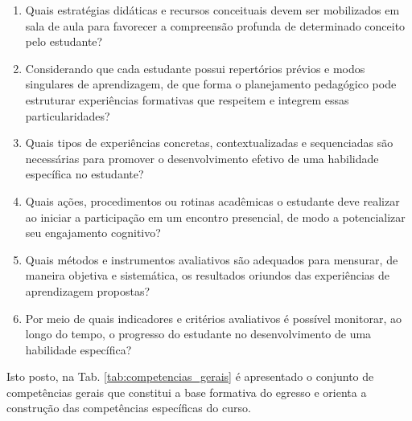 \begin{enumerate}
		\item Quais estratégias didáticas e recursos conceituais devem ser mobilizados em sala de aula para favorecer a compreensão profunda de determinado conceito pelo estudante?
		
		\item Considerando que cada estudante possui repertórios prévios e modos singulares de aprendizagem, de que forma o planejamento pedagógico pode estruturar experiências formativas que respeitem e integrem essas particularidades?
		
		\item Quais tipos de experiências concretas, contextualizadas e sequenciadas são necessárias para promover o desenvolvimento efetivo de uma habilidade específica no estudante?
		
		\item Quais ações, procedimentos ou rotinas acadêmicas o estudante deve realizar ao iniciar a participação em um encontro presencial, de modo a potencializar seu engajamento cognitivo?
		
		\item Quais métodos e instrumentos avaliativos são adequados para mensurar, de maneira objetiva e sistemática, os resultados oriundos das experiências de aprendizagem propostas?
		
		\item Por meio de quais indicadores e critérios avaliativos é possível monitorar, ao longo do tempo, o progresso do estudante no desenvolvimento de uma habilidade específica?
	\end{enumerate}

Isto posto, na Tab. \ref{tab:competencias_gerais}  é apresentado o conjunto de competências gerais que constitui a base formativa do egresso e orienta a construção das competências específicas do curso.


